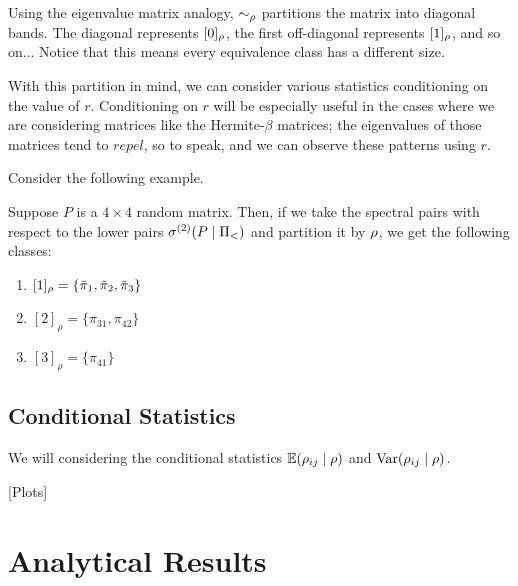 \begin{remark}
Using the eigenvalue matrix analogy, $\sim_{\rho}$ partitions the matrix into diagonal bands. The diagonal represents $[0]_{\rho}$, the first off-diagonal represents $[1]_{\rho}$, and so on... Notice that this means every equivalence class has a different size.
\end{remark}

With this partition in mind, we can consider various statistics conditioning on the value of $r$. Conditioning on $r$ will be especially useful in the cases where we are considering matrices like the Hermite-$\beta$ matrices; the eigenvalues of those matrices tend to $\textit{repel}$, so to speak, and we can observe these patterns using $r$. \newline

\noindent Consider the following example.

\begin{example}
Suppose $P$ is a $4 \times 4$ random matrix. Then, if we take the spectral pairs with respect to the lower pairs ${\sigma^{(2)}}(P \mid \Pi_<)$ and partition it by ${\rho}$, we get the following classes:
\begin{enumerate}
  \item $[1]_\rho = \{{\tilde{\pi}}_1, {\tilde{\pi}}_2, {\tilde{\pi}}_3\}$
  \item $[2]_\rho = \{\pi_{31}, \pi_{42}\}$
  \item $[3]_\rho = \{\pi_{41}\}$
\end{enumerate}
\end{example}

\subsection{Conditional Statistics}

We will considering the conditional statistics $\mathbb{E}({\rho}_{ij} \mid \rho)$ and $\text{Var}({\rho}_{ij} \mid \rho)$.

[Plots]


\section{Analytical Results}


